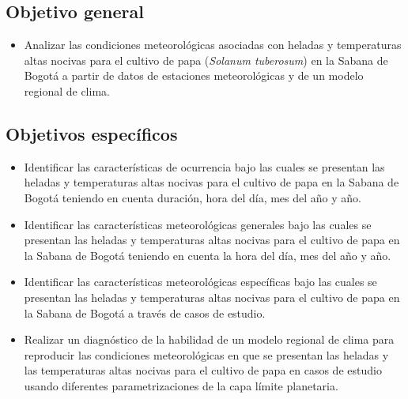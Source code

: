 \subsection{Objetivo general}

\begin{itemize}
    \item Analizar las condiciones meteorológicas asociadas con heladas y temperaturas altas nocivas para el cultivo de papa (\textit{Solanum tuberosum}) en la Sabana de Bogotá a partir de datos de estaciones meteorológicas y de un modelo regional de clima.
    
\end{itemize}

\subsection{Objetivos específicos}

\begin{itemize}
    \item Identificar las características de ocurrencia bajo las cuales se presentan las heladas y temperaturas altas nocivas para el cultivo de papa en la Sabana de Bogotá teniendo en cuenta duración, hora del día, mes del año y año.
    
    \item Identificar las características meteorológicas generales bajo las cuales se presentan las heladas y temperaturas altas nocivas para el cultivo de papa en la Sabana de Bogotá teniendo en cuenta la hora del día, mes del año y año.
    
    \item Identificar las características meteorológicas específicas bajo las cuales se presentan las heladas y temperaturas altas nocivas para el cultivo de papa en la Sabana de Bogotá a través de casos de estudio.
    
    \item Realizar un diagnóstico de la habilidad de un modelo regional de clima para reproducir las condiciones meteorológicas en que se presentan las heladas y las temperaturas altas nocivas para el cultivo de papa en casos de estudio usando diferentes parametrizaciones de la capa límite planetaria.
\end{itemize}